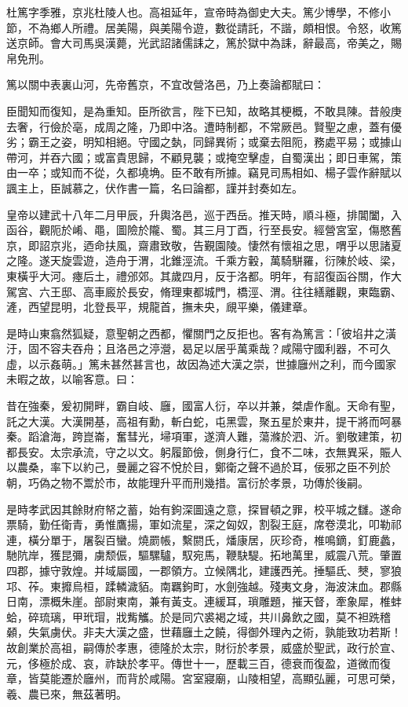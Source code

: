 
\begin{pinyinscope}
杜篤字季雅，京兆杜陵人也。高祖延年，宣帝時為御史大夫。篤少博學，不修小節，不為鄉人所禮。居美陽，與美陽令遊，數從請託，不諧，頗相恨。令怒，收篤送京師。會大司馬吳漢薨，光武詔諸儒誄之，篤於獄中為誄，辭最高，帝美之，賜帛免刑。

篤以關中表裏山河，先帝舊京，不宜改營洛邑，乃上奏論都賦曰：

臣聞知而復知，是為重知。臣所欲言，陛下已知，故略其梗概，不敢具陳。昔般庚去奢，行儉於亳，成周之隆，乃即中洛。遭時制都，不常厥邑。賢聖之慮，蓋有優劣；霸王之姿，明知相絕。守國之埶，同歸異術；或棄去阻阨，務處平易；或據山帶河，并吞六國；或富貴思歸，不顧見襲；或掩空擊虛，自蜀漢出；即日車駕，策由一卒；或知而不從，久都墝埆。臣不敢有所據。竊見司馬相如、楊子雲作辭賦以諷主上，臣誠慕之，伏作書一篇，名曰論都，謹并封奏如左。

皇帝以建武十八年二月甲辰，升輿洛邑，巡于西岳。推天時，順斗極，排閶闔，入函谷，觀阨於崤、黽，圖險於隴、蜀。其三月丁酉，行至長安。經營宮室，傷愍舊京，即詔京兆，迺命扶風，齋肅致敬，告覲園陵。悽然有懷祖之思，喟乎以思諸夏之隆。遂天旋雲遊，造舟于渭，北錐涇流。千乘方轂，萬騎駢羅，衍陳於岐、梁，東橫乎大河。瘞后土，禮邠郊。其歲四月，反于洛都。明年，有詔復函谷關，作大駕宮、六王邸、高車廄於長安，脩理東都城門，橋涇、渭。往往繕離觀，東臨霸、滻，西望昆明，北登長平，規龍首，撫未央，覛平樂，儀建章。

是時山東翕然狐疑，意聖朝之西都，懼關門之反拒也。客有為篤言：「彼埳井之潢汙，固不容夫吞舟；且洛邑之渟瀯，曷足以居乎萬乘哉？咸陽守國利器，不可久虛，以示姦萌。」篤未甚然甚言也，故因為述大漢之崇，世據廱州之利，而今國家未暇之故，以喻客意。曰：

昔在強秦，爰初開畔，霸自岐、廱，國富人衍，卒以并兼，桀虐作亂。天命有聖，託之大漢。大漢開基，高祖有勳，斬白蛇，屯黑雲，聚五星於東井，提干將而呵暴秦。蹈滄海，跨崑崙，奮彗光，埽項軍，遂濟人難，蕩滌於泗、沂。劉敬建策，初都長安。太宗承流，守之以文。躬履節儉，側身行仁，食不二味，衣無異采，賑人以農桑，率下以約己，曼麗之容不悅於目，鄭衛之聲不過於耳，佞邪之臣不列於朝，巧偽之物不鬻於巿，故能理升平而刑幾措。富衍於孝景，功傳於後嗣。

是時孝武因其餘財府帑之蓄，始有鉤深圖遠之意，探冒頓之罪，校平城之讎。遂命票騎，勤任衛青，勇惟鷹揚，軍如流星，深之匈奴，割裂王庭，席卷漠北，叩勒祁連，橫分單于，屠裂百蠻。燒罽帳，繫閼氏，燔康居，灰珍奇，椎鳴鏑，釘鹿蠡，馳阬岸，獲昆彌，虜颓侲，驅騾驢，馭宛馬，鞭駃騠。拓地萬里，威震八荒。肇置四郡，據守敦煌。并域屬國，一郡領方。立候隅北，建護西羌。捶驅氐、僰，寥狼邛、莋。東攠烏桓，蹂轔濊貊。南羈鉤町，水劍強越。殘夷文身，海波沫血。郡縣日南，漂概朱崖。部尉東南，兼有黃支。連緩耳，瑣雕題，摧天督，牽象犀，椎蚌蛤，碎琉璃，甲玳瑁，戕觜觿。於是同穴裘褐之域，共川鼻飲之國，莫不袒跣稽顙，失氣虜伏。非夫大漢之盛，世藉廱土之饒，得御外理內之術，孰能致功若斯！故創業於高祖，嗣傳於孝惠，德隆於太宗，財衍於孝景，威盛於聖武，政行於宣、元，侈極於成、哀，祚缺於孝平。傳世十一，歷載三百，德衰而復盈，道微而復章，皆莫能遷於廱州，而背於咸陽。宮室寢廟，山陵相望，高顯弘麗，可思可榮，羲、農已來，無茲著明。


\end{pinyinscope}
